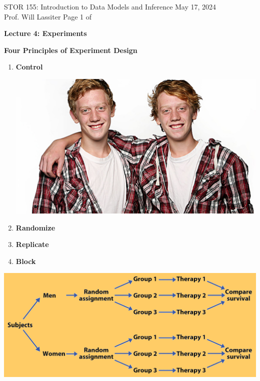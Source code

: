 \documentclass[11pt,letterpaper,twoside]{article}
\newcommand{\whatizit}{Lecture 4: Experiments}
\begin{document}
\thispagestyle{empty} \vspace*{-0.75in}

{\bssten STOR 155: Introduction to Data Models and Inference \hfill May 17, 2024 \\
Prof. Will Lassiter  \hfill Page 1 of \pageref{totalpag}}
\vspace{10pt}
\begin{center} {{\Large \bf \whatizit}} \end{center}

{\bf Four Principles of Experiment Design} \vspace{6pt}

\begin{enumerate}

\item {\bf Control}

\hspace{300pt} \includegraphics[scale=0.7]{images/twins.png}

\item {\bf Randomize} \vspace{80pt}

\item {\bf Replicate} \vspace{80pt}

\item {\bf Block} \vspace{80pt}

\end{enumerate}

\begin{center}
\includegraphics[scale=0.7]{images/block.png}
\end{center}
\end{document}
